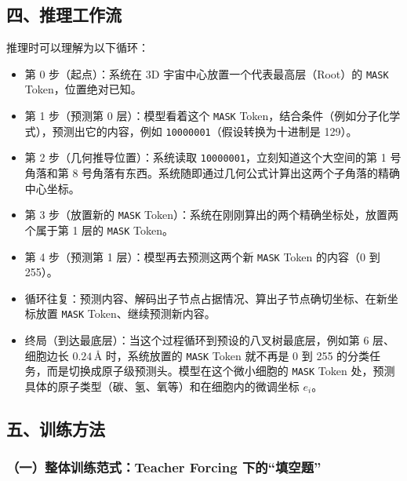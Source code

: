 \hypertarget{ux56dbux63a8ux7406ux5de5ux4f5cux6d41}{%
\subsection{四、推理工作流}\label{ux56dbux63a8ux7406ux5de5ux4f5cux6d41}}

推理时可以理解为以下循环：

\begin{itemize}
\tightlist
\item
  第 0 步（起点）：系统在 3D 宇宙中心放置一个代表最高层（Root）的 \texttt{MASK} Token，位置绝对已知。
\item
  第 1 步（预测第 0 层）：模型看着这个 \texttt{MASK} Token，结合条件（例如分子化学式），预测出它的内容，例如 \texttt{10000001}（假设转换为十进制是 129）。
\item
  第 2 步（几何推导位置）：系统读取 \texttt{10000001}，立刻知道这个大空间的第 1 号角落和第 8 号角落有东西。系统随即通过几何公式计算出这两个子角落的精确中心坐标。
\item
  第 3 步（放置新的 \texttt{MASK} Token）：系统在刚刚算出的两个精确坐标处，放置两个属于第 1 层的 \texttt{MASK} Token。
\item
  第 4 步（预测第 1 层）：模型再去预测这两个新 \texttt{MASK} Token 的内容（0 到 255）。
\item
  循环往复：预测内容、解码出子节点占据情况、算出子节点确切坐标、在新坐标放置 \texttt{MASK} Token、继续预测新内容。
\item
  终局（到达最底层）：当这个过程循环到预设的八叉树最底层，例如第 6 层、细胞边长 \(0.24\,\text{\AA}\) 时，系统放置的 \texttt{MASK} Token 就不再是 0 到 255 的分类任务，而是切换成原子级预测头。模型在这个微小细胞的 \texttt{MASK} Token 处，预测具体的原子类型（碳、氢、氧等）和在细胞内的微调坐标 \(e_i\)。
\end{itemize}

\hypertarget{ux4e94ux8badux7ec3ux65b9ux6cd5}{%
\subsection{五、训练方法}\label{ux4e94ux8badux7ec3ux65b9ux6cd5}}

\hypertarget{ux4e00ux6574ux4f53ux8badux7ec3ux8303ux5f0fteacher-forcing-ux4e0bux7684ux586bux7a7aux9898}{%
\subsubsection{（一）整体训练范式：Teacher Forcing 下的``填空题''}\label{ux4e00ux6574ux4f53ux8badux7ec3ux8303ux5f0fteacher-forcing-ux4e0bux7684ux586bux7a7aux9898}}


